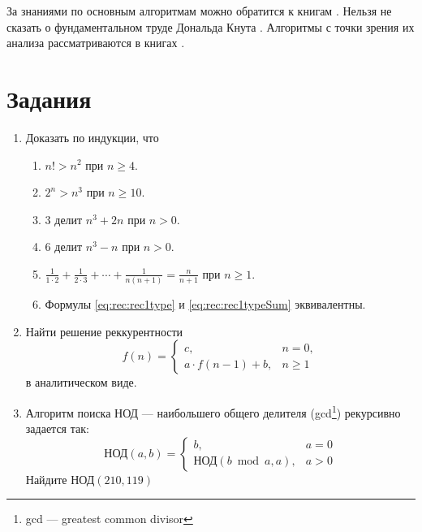 За знаниями по основным алгоритмам можно обратится к книгам \cite{bib:wirth:alghorithms,bib:kernigan:practice}. Нельзя не сказать о фундаментальном труде Дональда Кнута \cite{bib:knuth:artOfProgramming1, bib:knuth:artOfProgramming2, bib:knuth:artOfProgramming3}. Алгоритмы с точки зрения их анализа рассматриваются в книгах \cite{bib:mcconnel:alghorithmAnalysis, bib:miller:secParAlghorithm}.


\section*{Задания}

\begin{enumerate}
    \item Доказать по индукции, что  
    \begin{enumerate}
        \item $n!>n^2$ при $n\geq 4$.
        \item $2^n>n^3$ при $n\geq 10$.
        \item $3$ делит $n^3+2n$ при $n>0$.
        \item $6$ делит $n^3-n$ при $n>0$.
        \item $\frac{1}{1\cdot 2}+\frac{1}{2\cdot 3}+\cdots+\frac{1}{n(n+1)}=\frac{n}{n+1}$ при $n\geq 1$.
        \item Формулы \eqref{eq:rec:rec1type} и \eqref{eq:rec:rec1typeSum} эквивалентны.
    \end{enumerate}

    \item Найти решение реккурентности 
    \[
        f(n)=
        \begin{cases}
            c,                  &n=0,\\
            a\cdot f(n-1) + b,  &n\geq 1
        \end{cases}
    \]
    в аналитическом виде.
    
    \item Алгоритм поиска $\text{НОД}$ --- наибольшего общего делителя (gcd\footnote{gcd --- greatest common divisor}) рекурсивно задается так:
    \[
        \text{НОД}(a,b)=
        \begin{cases}
            b,                      &a=0\\
            \text{НОД}(b \bmod a,a),&a>0
        \end{cases}
    \]
    Найдите $\text{НОД}(210,119)$
    

\end{enumerate}
